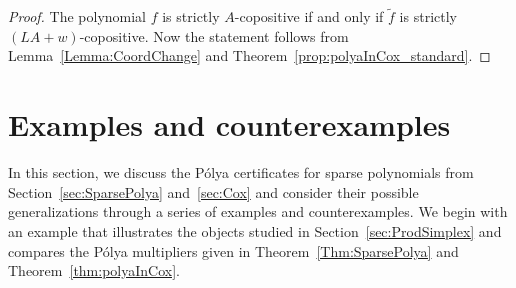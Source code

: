 \documentclass[a4paper,11pt]{amsart}
\theoremstyle{definition}
\begin{document}
\begin{proof}
    The polynomial $f$ is strictly $A$-copositive if and only if $\widetilde{f}$ is strictly $(LA+w)$-copositive. Now the statement follows from Lemma~\ref{Lemma:CoordChange} and Theorem~\ref{prop:polyaInCox_standard}.
\end{proof}


\section{Examples and counterexamples}
\label{sec:Examples}
In this section, we discuss the Pólya certificates for sparse polynomials from Section~\ref{sec:SparsePolya} and~\ref{sec:Cox} and consider their possible generalizations through a series of examples and counterexamples. We begin with an example that illustrates the objects studied in Section~\ref{sec:ProdSimplex} and compares the Pólya multipliers given in Theorem~\ref{Thm:SparsePolya} and Theorem~\ref{thm:polyaInCox}.
\end{document}
